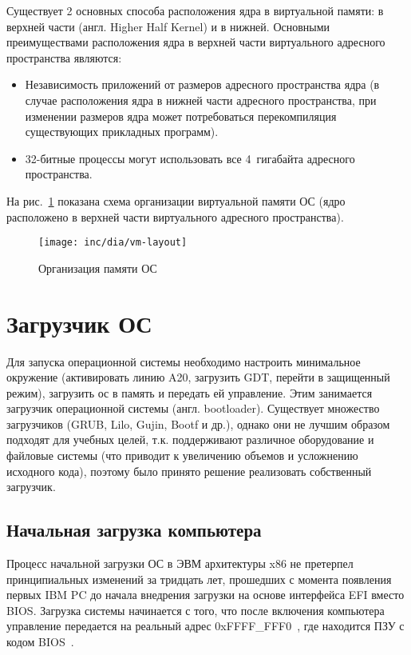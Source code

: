Существует 2 основных способа расположения ядра в виртуальной памяти: в верхней части (англ. Higher Half Kernel)
и в нижней. Основными преимуществами расположения ядра в верхней части виртуального адресного пространства являются:
\begin{itemize}
\item Независимость приложений от размеров адресного пространства ядра (в случае расположения ядра в нижней части
	адресного пространства, при изменении размеров ядра может потребоваться перекомпиляция существующих
	прикладных программ).
\item 32-битные процессы могут использовать все 4~гигабайта адресного пространства.
\end{itemize}

На рис.~\ref{fig:vm-layout} показана схема организации виртуальной памяти ОС
(ядро расположено в верхней части виртуального адресного пространства).

\begin{figure}[ht!]
  \centering
  \texttt{[image: inc/dia/vm-layout]}
  \caption{Организация памяти ОС}
  \label{fig:vm-layout}
\end{figure}


\section{Загрузчик ОС}
Для запуска операционной системы необходимо настроить минимальное окружение (активировать линию A20,
загрузить GDT, перейти в защищенный режим), загрузить ос в память и передать ей управление.
Этим занимается загрузчик операционной системы (англ. bootloader). Существует множество загрузчиков
(GRUB, Lilo, Gujin, Bootf и др.), однако они не лучшим образом подходят для учебных целей, т.к. поддерживают
различное оборудование и файловые системы (что приводит к увеличению объемов и усложнению исходного кода),
поэтому было принято решение реализовать собственный загрузчик.

\subsection{Начальная загрузка компьютера}
Процесс начальной загрузки ОС в ЭВМ архитектуры x86 не претерпел
принципиальных изменений за тридцать лет, прошедших с момента появления
первых IBM PC до начала внедрения загрузки на основе интерфейса EFI вместо
BIOS. Загрузка системы начинается с того, что после включения компьютера
управление передается на реальный адрес 0xFFFF\_FFF0~\cite{amd_pm_v2}, где находится
ПЗУ с кодом BIOS~\cite{mstu_os_dev_method}.

